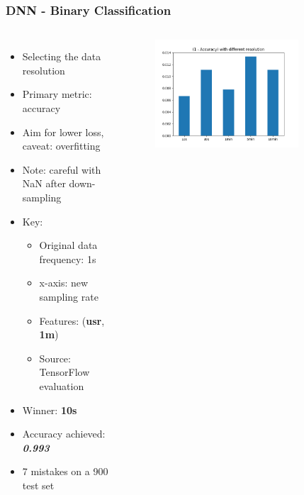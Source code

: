 \documentclass[aspectratio=169,11pt,hyperref={colorlinks=true}]{beamer}
\begin{document}
\begin{frame}
    \frametitle{DNN - Binary Classification}
    \begin{columns}
        \begin{itemize}
            \item{Selecting the data resolution}
            \item{Primary metric: accuracy}
            \item{Aim for lower loss, caveat: overfitting}
            \item{Note: careful with NaN after down-sampling}
            \item{Key:}
            \begin{itemize}
              \item{Original data frequency: 1s}
              \item{x-axis: new sampling rate}
              \item{Features: (\textbf{usr}, \textbf{1m})}
              \item{Source: TensorFlow evaluation}
            \end{itemize}
            \item{Winner: \textbf{10s}}
            \item{Accuracy achieved: \emph{\textbf{0.993}}}
            \item{7 mistakes on a 900 test set}
        \end{itemize}
        \begin{center}
        \begin{figure}
          \includegraphics[width=0.8\textwidth,height=0.4\textheight]{graphs/accuracy_by_sampling-status.png}

\end{figure}
\end{center}
\end{columns}
\end{frame}
\end{document}
